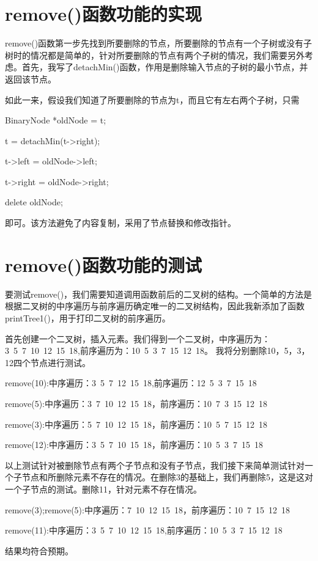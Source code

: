 \documentclass[UTF8]{ctexart}
\begin{document}
\pagestyle{fancy}
\fancyhead{}

\section{remove()函数功能的实现}
\hspace{0em}remove()函数第一步先找到所要删除的节点，所要删除的节点有一个子树或没有子树时的情况都是简单的，针对所要删除的节点有两个子树的情况，我们需要另外考虑。首先，我写了detachMin()函数，作用是删除输入节点的子树的最小节点，并返回该节点。

\hspace{0em}如此一来，假设我们知道了所要删除的节点为t，而且它有左右两个子树，只需

BinaryNode *oldNode = t;

t = detachMin(t->right);

t->left = oldNode->left;

t->right = oldNode->right;

delete oldNode;

即可。该方法避免了内容复制，采用了节点替换和修改指针。

\section{remove()函数功能的测试}
\hspace{0em}要测试remove()，我们需要知道调用函数前后的二叉树的结构。一个简单的方法是根据二叉树的中序遍历与前序遍历确定唯一的二叉树结构，因此我新添加了函数printTree1()，用于打印二叉树的前序遍历。

\hspace{0em}首先创建一个二叉树，插入元素。我们得到一个二叉树，中序遍历为：3\ 5\ 7\ 10\ 12\ 15\ 18,前序遍历为：10\ 5\ 3\ 7\ 15\ 12\ 18。 我将分别删除10，5，3，12四个节点进行测试。

\hspace{0em}remove(10):中序遍历：3\ 5\ 7\ 12\ 15\ 18,前序遍历：12\ 5\ 3\ 7\ 15\ 18

\hspace{0em}remove(5):中序遍历：3\ 7\ 10\ 12\ 15\ 18，前序遍历：10\ 7\ 3\ 15\ 12\ 18

\hspace{0em}remove(3):中序遍历：5\ 7\ 10\ 12\ 15\ 18，前序遍历：10\ 5\ 7\ 15\ 12\ 18

\hspace{0em}remove(12):中序遍历：3\ 5\ 7\ 10\ 15\ 18，前序遍历：10\ 5\ 3\ 7\ 15\ 18

\hspace{0em}以上测试针对被删除节点有两个子节点和没有子节点，我们接下来简单测试针对一个子节点和所删除元素不存在的情况。在删除3的基础上，我们再删除5，这是这对一个子节点的测试。删除11，针对元素不存在情况。

\hspace{0em}remove(3);remove(5):中序遍历：7\ 10\ 12\ 15\ 18，前序遍历：10\ 7\ 15\ 12\ 18

\hspace{0em}remove(11):中序遍历：3\ 5\ 7\ 10\ 12\ 15\ 18,前序遍历：10\ 5\ 3\ 7\ 15\ 12\ 18

结果均符合预期。
\end{document}
